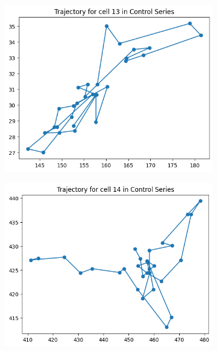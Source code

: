 \documentclass{article}
\begin{document}
\clearpage

\begin{figure}[h!]
    \centering
    \begin{subfigure}[b]{0.5\linewidth}
        \centering
        \includegraphics[width=\linewidth]{Report/Appendix_Images/Trajectory-A-Control/trajectory_13.png}
    \end{subfigure}%
    \begin{subfigure}[b]{0.5\linewidth}
        \centering
        \includegraphics[width=\linewidth]{Report/Appendix_Images/Trajectory-A-Control/trajectory_14.png}
    \end{subfigure}

\end{figure}
\end{document}
